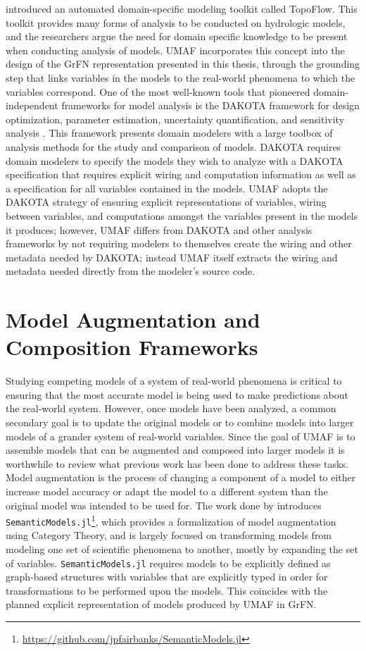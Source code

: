 \citet{peckham2017reproducible} introduced an automated domain-specific modeling toolkit called TopoFlow.
This toolkit provides many forms of analysis to be conducted on hydrologic models, and the researchers argue the need for domain specific knowledge to be present when conducting analysis of models.
UMAF incorporates this concept into the design of the GrFN representation presented in this thesis, through the grounding step that links variables in the models to the real-world phenomena to which the variables correspond.
One of the most well-known tools that pioneered domain-independent frameworks for model analysis is the DAKOTA framework for design optimization, parameter estimation, uncertainty quantification, and sensitivity analysis \citep{adams2009dakota}.
This framework presents domain modelers with a large toolbox of analysis methods for the study and comparison of models.
DAKOTA requires domain modelers to specify the models they wish to analyze with a DAKOTA specification that requires explicit wiring and computation information as well as a specification for all variables contained in the models.
UMAF adopts the DAKOTA strategy of ensuring explicit representations of variables, wiring between variables, and computations amongst the variables present in the models it produces; however, UMAF differs from DAKOTA and other analysis frameworks by not requiring modelers to themselves create the wiring and other metadata needed by DAKOTA; instead UMAF itself extracts the wiring and metadata needed directly from the modeler's source code.

\section{Model Augmentation and Composition Frameworks \label{sec:rwork_composition}}
Studying competing models of a system of real-world phenomena is critical to ensuring that the most accurate model is being used to make predictions about the real-world system.
However, once models have been analyzed, a common secondary goal is to update the original models or to combine models into larger models of a grander system of real-world variables.
Since the goal of UMAF is to assemble models that can be augmented and composed into larger models it is worthwhile to review what previous work has been done to address these tasks.
Model augmentation is the process of changing a component of a model to either increase model accuracy or adapt the model to a different system than the original model was intended to be used for.
The work done by \citet{semanticModels2019} introduces \texttt{SemanticModels.jl}\footnote{\url{https://github.com/jpfairbanks/SemanticModels.jl}}, which provides a formalization of model augmentation using Category Theory, and is largely focused on transforming models from modeling one set of scientific phenomena to another, mostly by expanding the set of variables.
\texttt{SemanticModels.jl} requires models to be explicitly defined as graph-based structures with variables that are explicitly typed in order for transformations to be performed upon the models.
This coincides with the planned explicit representation of models produced by UMAF in GrFN.

